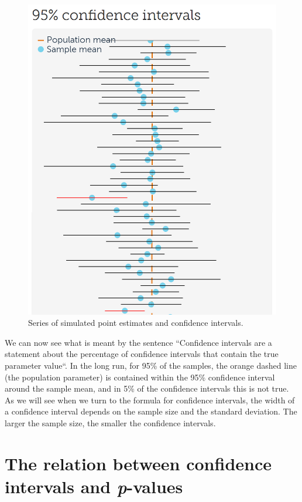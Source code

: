 \documentclass[
  oneside]{krantz}
\begin{document}
\begin{figure}

{\centering \includegraphics[width=1\linewidth]{images/cisim} 

}

\caption{Series of simulated point estimates and confidence intervals.}\label{fig:cisim}
\end{figure}

We can now see what is meant by the sentence ``Confidence intervals are a statement about the percentage of confidence intervals that contain the true parameter value``. In the long run, for 95\% of the samples, the orange dashed line (the population parameter) is contained within the 95\% confidence interval around the sample mean, and in 5\% of the confidence intervals this is not true. As we will see when we turn to the formula for confidence intervals, the width of a confidence interval depends on the sample size and the standard deviation. The larger the sample size, the smaller the confidence intervals.

\hypertarget{relatCIp}{%
\section{\texorpdfstring{The relation between confidence intervals and \emph{p}-values}{The relation between confidence intervals and p-values}}\label{relatCIp}}
\end{document}
